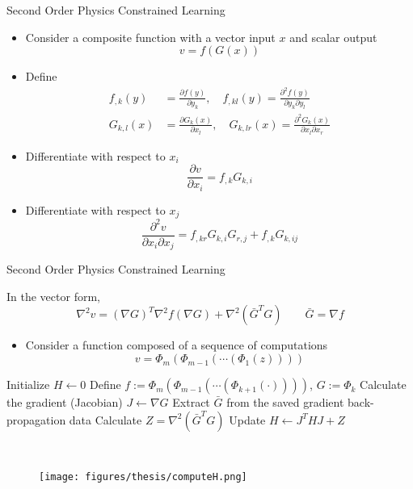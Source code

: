 \documentclass[usenames,dvipsnames]{beamer}
\begin{document}
\begin{frame}{Second Order Physics Constrained Learning}
	\begin{itemize}
\item Consider a composite function with a vector input $x$ and scalar output 
\begin{equation}\label{equ:t1}
	v = f(G(x))
\end{equation}
\item Define 
{\small
\begin{align*}
	f_{,k}(y) &= \frac{\partial f(y)}{\partial y_k}, \quad f_{,kl}(y) = \frac{\partial^2 f(y)}{\partial y_k \partial y_l} \\ 
	G_{k,l}(x) &=\frac{\partial G_k(x)}{\partial x_l},\quad G_{k, lr}(x) = \frac{\partial^2 G_k(x)}{\partial x_l\partial x_r}
\end{align*}
}
\item Differentiate  with respect to $x_i$
\begin{equation}\label{equ:t2}
\frac{\partial v}{\partial x_i} = f_{,k}G_{k,i}
\end{equation}
\item Differentiate  with respect to $x_j$
$$\boxed{\frac{\partial^2 v}{\partial x_i \partial x_j} = f_{,kr} G_{k,i} G_{r,j} + f_{,k} G_{k,ij}}$$
	\end{itemize}

\end{frame}


\begin{frame}{Second Order Physics Constrained Learning}


In the vector form,
$$\boxed{\nabla^2 v = (\nabla G)^T \nabla^2 f (\nabla G) + \nabla^2 (\bar G^T G)\qquad \bar G = \nabla f}$$

\begin{itemize}
\item Consider a function composed of a  sequence of computations
$$v = \Phi_m(\Phi_{m-1}(\cdots (\Phi_1(z))))$$
\end{itemize}


\begin{minipage}{0.7\textwidth}
	\small
\begin{algorithmic}[1]
	\State Initialize $H \gets 0$
	\State Define $f:= \Phi_m (\Phi_{m-1} (\cdots (\Phi_{k+1}(\cdot))))$, $G:= \Phi_k$
	\State Calculate the gradient (Jacobian) $J \gets \nabla G$
	\State Extract $\bar G$ from the saved gradient back-propagation data
	\State Calculate $Z = \nabla^2(\bar G^T G)$ \label{algo:second-order-algo-update-line}
	\State Update $H \gets J^THJ + Z$
	\EndFor
\end{algorithmic}
\end{minipage}~
\begin{minipage}{0.3\textwidth}
\begin{figure}
	\centering
	\texttt{[image: figures/thesis/computeH.png]}
\end{figure}
\end{minipage}


\end{frame}
\end{document}
